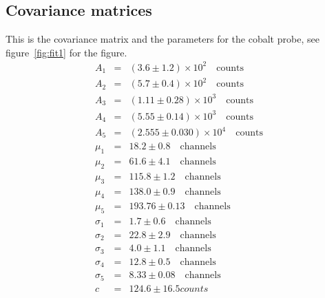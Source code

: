\subsection{Covariance matrices}
\label{subs:covariance}
This is the covariance matrix and the parameters for the cobalt probe, see
figure~\ref{fig:fit1} for the figure.
   \begin{align*}
    A_1 &=& \left(3.6 \pm 1.2\right) \times 10^{2} \quad \mathrm{counts}\\
    A_2 &=& \left(5.7 \pm 0.4\right) \times 10^{2} \quad \mathrm{counts}\\
    A_3 &=& \left(1.11 \pm 0.28\right) \times 10^{3} \quad \mathrm{counts}\\
    A_4 &=& \left(5.55 \pm 0.14\right) \times 10^{3} \quad \mathrm{counts}\\
    A_5 &=& \left(2.555 \pm 0.030\right) \times 10^{4} \quad \mathrm{counts}\\
    \mu_1 &=& 18.2 \pm 0.8 \quad \mathrm{channels}\\
    \mu_2 &=& 61.6 \pm 4.1 \quad \mathrm{channels}\\
    \mu_3 &=& 115.8 \pm 1.2 \quad \mathrm{channels}\\
    \mu_4 &=& 138.0 \pm 0.9 \quad \mathrm{channels}\\
    \mu_5 &=& 193.76 \pm 0.13 \quad \mathrm{channels}\\ \sigma_1 &=& 1.7 \pm 0.6 \quad \mathrm{channels}\\ \sigma_2 &=& 22.8 \pm 2.9 \quad \mathrm{channels}\\ \sigma_3 &=& 4.0 \pm 1.1 \quad \mathrm{channels}\\
    \sigma_4 &=& 12.8 \pm 0.5 \quad \mathrm{channels}\\
    \sigma_5 &=& 8.33 \pm 0.08 \quad \mathrm{channels}\\
    c &=& 124.6 \pm 16.5 counts
    \end{align*}
\tiny
